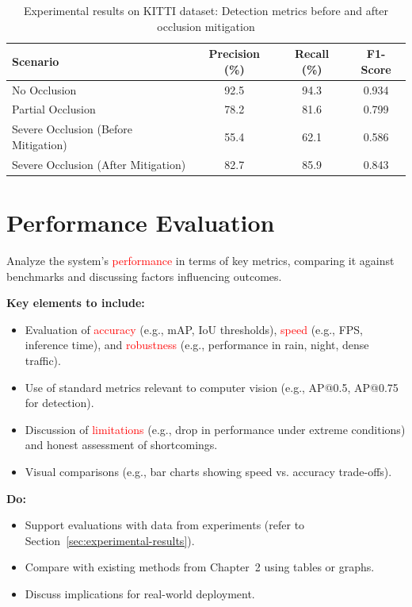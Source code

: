 \documentclass[12pt,a4paper]{report}
\theoremstyle{definition}
\theoremstyle{remark}
\begin{document}
\begin{table}[h]
    \centering
    \caption{Experimental results on KITTI dataset: Detection metrics before and after occlusion mitigation}
    \label{tab:experimental-metrics}
    \begin{tabular}{|l|c|c|c|}
    \hline
    \textbf{Scenario} & \textbf{Precision (\%)} & \textbf{Recall (\%)} & \textbf{F1-Score} \\
    \hline
    No Occlusion & 92.5 & 94.3 & 0.934 \\
    Partial Occlusion & 78.2 & 81.6 & 0.799 \\
    Severe Occlusion (Before Mitigation) & 55.4 & 62.1 & 0.586 \\
    Severe Occlusion (After Mitigation) & 82.7 & 85.9 & 0.843 \\
    \hline
    \end{tabular}
\end{table}

\section{Performance Evaluation}
\label{sec:performance-evaluation}

Analyze the system's \textcolor{red}{performance} in terms of key metrics, comparing it against benchmarks and discussing factors influencing outcomes.

\noindent \textbf{Key elements to include:}
\begin{itemize}
    \item Evaluation of \textcolor{red}{accuracy} (e.g., mAP, IoU thresholds), \textcolor{red}{speed} (e.g., FPS, inference time), and \textcolor{red}{robustness} (e.g., performance in rain, night, dense traffic).
    \item Use of standard metrics relevant to computer vision (e.g., AP@0.5, AP@0.75 for detection).
    \item Discussion of \textcolor{red}{limitations} (e.g., drop in performance under extreme conditions) and honest assessment of shortcomings.
    \item Visual comparisons (e.g., bar charts showing speed vs. accuracy trade-offs).
\end{itemize}

\noindent \textbf{Do:}
\begin{itemize}
    \item Support evaluations with data from experiments (refer to Section~\ref{sec:experimental-results}).
    \item Compare with existing methods from Chapter~2 using tables or graphs.
    \item Discuss implications for real-world deployment.
\end{itemize}
\end{document}
